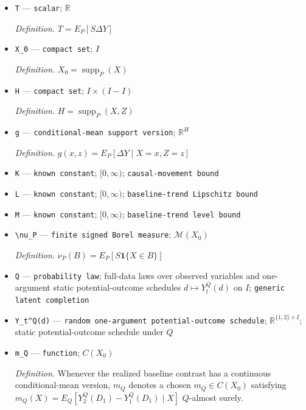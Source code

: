 \documentclass{article}
\begin{document}
\begin{itemize}
  \par\smallskip\noindent\emph{Definition.} \(A=E_P|Z|\)
  \item \texttt{T} --- \texttt{scalar}; \(\mathbb R\)
  \par\smallskip\noindent\emph{Definition.} \(T=E_P[S\Delta Y]\)
  \item \texttt{X\_\allowbreak{}0} --- \texttt{compact set}; \(I\)
  \par\smallskip\noindent\emph{Definition.} \(X_0=\operatorname{supp}_P(X)\)
  \item \texttt{H} --- \texttt{compact set}; \(I\times(I-I)\)
  \par\smallskip\noindent\emph{Definition.} \(H=\operatorname{supp}_P(X,Z)\)
  \item \texttt{g} --- \texttt{conditional-\allowbreak{}mean support version}; \(\mathbb R^H\)
  \par\smallskip\noindent\emph{Definition.} \(g(x,z)=E_P[\Delta Y\mid X=x,Z=z]\)
  \item \texttt{K} --- \texttt{known constant}; \([0,\infty)\); \texttt{causal-\allowbreak{}movement bound}
  \item \texttt{L} --- \texttt{known constant}; \([0,\infty)\); \texttt{baseline-\allowbreak{}trend Lipschitz bound}
  \item \texttt{M} --- \texttt{known constant}; \([0,\infty)\); \texttt{baseline-\allowbreak{}trend level bound}
  \item \texttt{\textbackslash{}\allowbreak{}nu\_\allowbreak{}P} --- \texttt{finite signed Borel measure}; \(\mathcal M(X_0)\)
  \par\smallskip\noindent\emph{Definition.} \(\nu_P(B)=E_P[S\mathbf 1\{X\in B\}]\)
  \item \texttt{Q} --- \texttt{probability law}; full-data laws over observed variables and one-argument static potential-outcome schedules \(d\mapsto Y_t^Q(d)\) on \(I\); \texttt{generic latent completion}
  \item \texttt{Y\_\allowbreak{}t\textasciicircum{}Q(d)} --- \texttt{random one-\allowbreak{}argument potential-\allowbreak{}outcome schedule}; \(\mathbb R^{\{1,2\}\times I}\); static potential-outcome schedule under \(Q\)
  \item \texttt{m\_\allowbreak{}Q} --- \texttt{function}; \(C(X_0)\)
  \par\smallskip\noindent\emph{Definition.} Whenever the realized baseline contrast has a continuous conditional-mean version, \(m_Q\) denotes a chosen \(m_Q\in C(X_0)\) satisfying \(m_Q(X)=E_Q[Y_2^Q(D_1)-Y_1^Q(D_1)\mid X]\) \(Q\)-almost surely.

\end{itemize}
\end{document}
